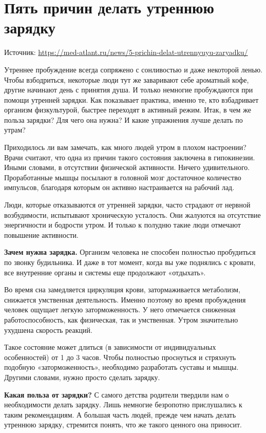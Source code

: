 \newpage
\section{Пять причин делать утреннюю зарядку}
Источник: \url{https://med-atlant.ru/news/5-prichin-delat-utrennyuyu-zaryadku/}

Утреннее пробуждение всегда сопряжено с сонливостью и даже некоторой ленью. Чтобы взбодриться, некоторые люди тут же заваривают себе ароматный кофе, другие начинают день с принятия душа. И только немногие пробуждаются при помощи утренней зарядки. Как показывает практика, именно те, кто взбадривает организм физкультурой, быстрее переходят в активный режим. Итак, в чем же польза зарядки? Для чего она нужна? И какие упражнения лучше делать по утрам?

Приходилось ли вам замечать, как много людей утром в плохом настроении? Врачи считают, что одна из причин такого состояния заключена в гипокинезии. Иными словами, в отсутствии физической активности. Ничего удивительного. Проработанные мышцы посылают в головной мозг достаточное количество импульсов, благодаря которым он активно настраивается на рабочий лад.

Люди, которые отказываются от утренней зарядки, часто страдают от нервной возбудимости, испытывают хроническую усталость. Они жалуются на отсутствие энергичности и бодрости утром. И только к полудню такие люди отмечают повышение активности.

\textbf{Зачем нужна зарядка.}
Организм человека не способен полностью пробудиться по звонку будильника. И даже в тот момент, когда вы уже поднялись с кровати, все внутренние органы и системы еще продолжают «отдыхать».

Во время сна замедляется циркуляция крови, затормаживается метаболизм, снижается умственная деятельность. Именно поэтому во время пробуждения человек ощущает легкую заторможенность. У него отмечается сниженная работоспособность, как физическая, так и умственная. Утром значительно ухудшена скорость реакций.

Такое состояние может длиться (в зависимости от индивидуальных особенностей) от 1 до 3 часов. Чтобы полностью проснуться и стряхнуть подобную «заторможенность», необходимо разработать суставы и мышцы. Другими словами, нужно просто сделать зарядку.

\textbf{Какая польза от зарядки?}
С самого детства родители твердили нам о необходимости делать зарядку. Лишь немногие безропотно прислушались к таким рекомендациям. А большая часть людей, прежде чем начать делать утреннюю зарядку, стремится понять, что же такого ценного она приносит.

